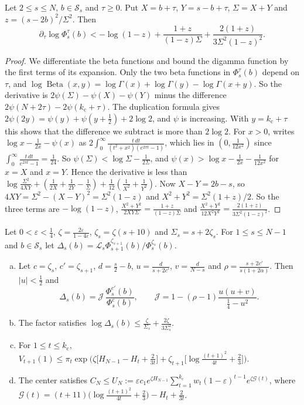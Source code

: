 \begin{lemma}\label{lem:A-cderiv}
Let $2\le s\le N$, $b\in\mathcal S_s$ and $\tau\ge0$. Put $X=b+\tau$,
$Y=s-b+\tau$, $\Sigma=X+Y$ and $z=(s-2b)^2/\Sigma^2$. Then
\[
 \partial_\tau\log\Phi^\tau_s(b)
 <-\log(1-z)+\frac{1+z}{(1-z)\Sigma}+\frac{2(1+z)}{3\Sigma^2(1-z)^2}.
\]
\end{lemma}

\begin{proof}
We differentiate the beta functions and bound the digamma function by the
first terms of its expansion. Only the two beta functions in $\Phi^\tau_s(b)$
depend on $\tau$, and
$\log\operatorname{Beta}(x,y)=\log\Gamma(x)+\log\Gamma(y)-\log\Gamma(x+y)$. So the
derivative is $2\psi(\Sigma)-\psi(X)-\psi(Y)$ minus the difference
$2\psi(N+2\tau)-2\psi({k_{\mathrm c}}+\tau)$. The duplication formula
\cite[5.5.5]{dlmf} gives $2\psi(2y)=\psi(y)+\psi(y+\frac12)+2\log2$, and
$\psi$ is increasing. With $y={k_{\mathrm c}}+\tau$ this shows that the difference we
subtract is more than $2\log2$. For $x>0$, \cite[5.9.15]{dlmf} writes
$\log x-\frac1{2x}-\psi(x)$ as
$2\int_0^\infty\frac{t\,dt}{(t^2+x^2)(e^{2\pi t}-1)}$, which lies in
$(0,\frac1{12x^2})$ since
$\int_0^\infty\frac{t\,dt}{e^{2\pi t}-1}=\frac1{24}$. So
$\psi(\Sigma)<\log\Sigma-\frac1{2\Sigma}$, and
$\psi(x)>\log x-\frac1{2x}-\frac1{12x^2}$ for $x=X$ and $x=Y$. Hence the
derivative is less than
$\log\frac{\Sigma^2}{4XY}+(\frac1{2X}+\frac1{2Y}-\frac1\Sigma)
+\frac1{12}(\frac1{X^2}+\frac1{Y^2})$. Now $X-Y=2b-s$, so $4XY=\Sigma^2-(X-Y)^2=\Sigma^2(1-z)$ and
$X^2+Y^2=\Sigma^2(1+z)/2$. So the three terms are $-\log(1-z)$,
$\frac{X^2+Y^2}{2XY\Sigma}=\frac{1+z}{(1-z)\Sigma}$ and
$\frac{X^2+Y^2}{12X^2Y^2}=\frac{2(1+z)}{3\Sigma^2(1-z)^2}$.
\end{proof}

\begin{proposition}\label{prop:A-super}
Let $0<\varepsilon<\frac14$, $\zeta=\frac{2\varepsilon}{1-4\varepsilon}$,
$\zeta_s=\zeta(s+10)$ and $\Sigma_s=s+2\zeta_s$. For $1\le s\le N-1$ and
$b\in\mathcal S_s$ let
$\Delta_s(b)=\mathcal L_s\Phi^{\zeta_{s+1}}_{s+1}(b)\big/\Phi^{\zeta_s}_s(b)$.
\begin{enumerate}[(a)]
\item Let $c=\zeta_s$, $c'=\zeta_{s+1}$, $d=\frac s2-b$, $u=\frac{d}{s+2c'}$,
$v=\frac d{N-s}$ and $\rho=\frac{s+2c'}{s(1+2\alpha)}$. Then $|u|<\frac12$
and
\[
 \Delta_s(b)=\mathcal J\,\frac{\Phi^{c'}_s(b)}{\Phi^{c}_s(b)},\qquad
 \mathcal J=1-(\rho-1)\frac{u(u+v)}{\frac14-u^2}.
\]
\item The factor satisfies
$\log \Delta_s(b)\le\frac{\zeta}{\Sigma_s}+\frac{2\zeta}{3\Sigma_s^2}$.
\item For $1\le t\le {k_{\mathrm c}}$,
$V_{t+1}(1)\le\pi_t\exp\bigl(\zeta\bigl[H_{N-1}-H_t+\frac2{3t}\bigr]
+\zeta_{t+1}\bigl[\log\frac{(t+1)^2}{4t}+\frac23\bigr]\bigr)$.
\item The center satisfies
$C_N\le U_N:=\varepsilon c_1e^{\zeta H_{N-1}}\sum_{t=1}^{k_{\mathrm c}}w_t
(1-\varepsilon)^{t-1}e^{\zeta\mathcal G(t)}$, where
$\mathcal G(t)=(t+11)\bigl(\log\frac{(t+1)^2}{4t}+\frac23\bigr)-H_t+\frac2{3t}$.
\end{enumerate}
\end{proposition}

